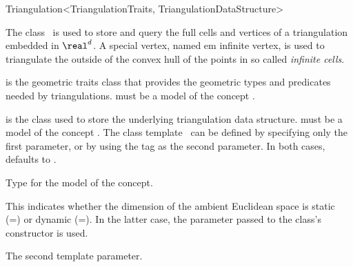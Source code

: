 \begin{ccRefClass}{Triangulation<TriangulationTraits, TriangulationDataStructure>}

\ccDefinition

The class \ccRefName\ is used to store and query the full cells and vertices of
a triangulation embedded in $\real^d$. A special vertex, named
{em infinite vertex}, is used to triangulate the  outside of the convex
hull of the points in so called {\em infinite cells}.


\ccParameters

 is the geometric traits class that provides the geometric types
and predicates needed by triangulations.  must be a model of the
concept .

 is the class used to store the underlying triangulation data
structure.  must be a model of the concept
. The class template \ccRefName\ can
be defined  by specifying only the first parameter, or by using the
tag  as
the second parameter. In both cases,  defaults to
.

\ccTypes
{}

%
{Type for the model of the  concept.}


%
{This indicates whether the dimension of the ambient Euclidean space is static
(=\ccGlobalScope{}) or
dynamic (=\ccGlobalScope{}).
In the latter case, the  parameter passed to the class's constructor
is used.}

%
{The second template parameter.}



\end{ccRefClass}
